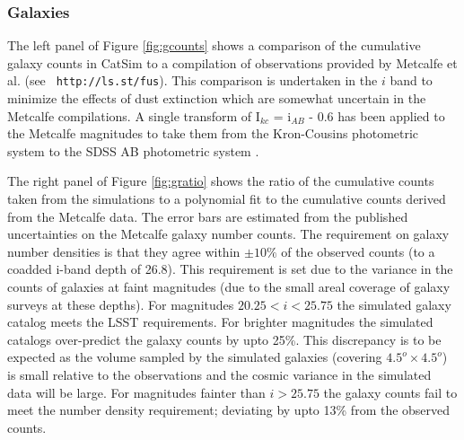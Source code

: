 \documentclass[11pt]{article}
\begin{document}
\subsubsection{Galaxies \label{sec:galaxycounts}}

The left panel of Figure \ref{fig:gcounts} shows a comparison of the
cumulative galaxy counts in CatSim to a compilation of observations
provided by Metcalfe et al. (see {\tt
  http://ls.st/fus}).  This
comparison is undertaken in the $i$ band to minimize the effects of
dust extinction which are somewhat uncertain in the Metcalfe
compilations.  A single transform of I$_{kc}$ = i$_{AB}$ - 0.6 has
been applied to the Metcalfe magnitudes to take them from the
Kron-Cousins photometric system to the SDSS AB photometric system \citep{ellis07}.

The right panel of Figure \ref{fig:gratio} shows the ratio of the
cumulative counts taken from the simulations to a polynomial fit to
the cumulative counts derived from the Metcalfe data.  The error bars
are estimated from the published uncertainties on the Metcalfe galaxy
number counts. The requirement on galaxy number densities is that they
agree within $\pm10\%$ of the observed counts (to a coadded i-band
depth of 26.8). This requirement is set due to the variance in the
counts of galaxies at faint magnitudes (due to the small areal
coverage of galaxy surveys at these depths).  For magnitudes
$20.25<i<25.75$ the simulated galaxy catalog meets the LSST
requirements.  For brighter magnitudes the simulated catalogs
over-predict the galaxy counts by upto 25\%. This discrepancy is to be
expected as the volume sampled by the simulated galaxies (covering
$4.5^o \times 4.5^o$) is small relative to the observations and the
cosmic variance in the simulated data will be large. For magnitudes
fainter than $i>25.75$ the galaxy counts fail to meet the number
density requirement; deviating by upto 13\% from the observed counts.

\end{document}
